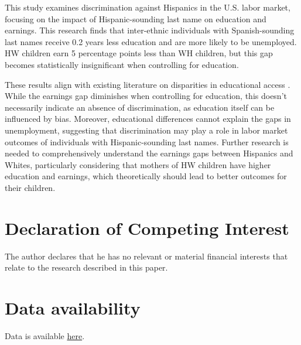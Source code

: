 \documentclass[a4paper,fleqn]{cas-sc}
\begin{document}
This study examines discrimination against Hispanics in the U.S. labor market, focusing on the impact of Hispanic-sounding last name on education and earnings. This research finds that inter-ethnic individuals with Spanish-sounding last names receive 0.2 years less education and are more likely to be unemployed. HW children earn 5 percentage points less than WH children, but this gap becomes statistically insignificant when controlling for education.

These results align with existing literature on disparities in educational access \citep{bergman2018education,gaddis2024racial}. While the earnings gap diminishes when controlling for education, this doesn't necessarily indicate an absence of discrimination, as education itself can be influenced by bias. Moreover, educational differences cannot explain the gaps in unemployment, suggesting that discrimination may play a role in labor market outcomes of individuals with Hispanic-sounding last names. Further research is needed to comprehensively understand the earnings gaps between Hispanics and Whites, particularly considering that mothers of HW children have higher education and earnings, which theoretically should lead to better outcomes for their children.


\section*{Declaration of Competing Interest}
The author declares that he has no relevant or material financial interests that relate to the research described in this paper.

\section*{Data availability}

Data is available \href{https://github.com/hhadah/hispanic-last-names/tree/main/data/datasets}{here}.

\newpage
\clearpage



\newpage
\clearpage


\newpage
\clearpage



\newpage
\clearpage



\newpage
\clearpage


\end{document}

